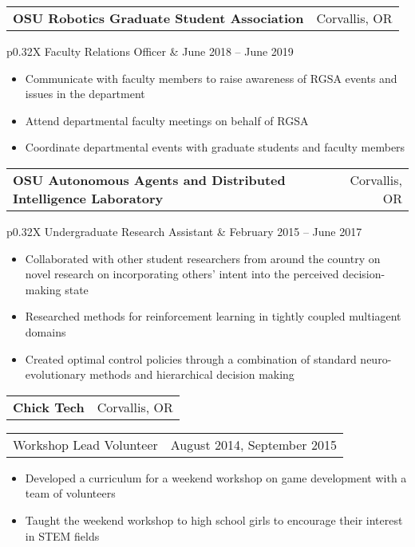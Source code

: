\documentclass[letterpaper,10pt,titlepage]{article}
\newcommand{\leftW}{0.32\textwidth}
\begin{document}
\begin{tabularx}{\linewidth}{Xr}
	\textbf{OSU Robotics Graduate Student Association} & Corvallis, OR\\
\end{tabularx}
\begin{tabularx}{\linewidth}{p{\leftW}X}
Faculty Relations Officer          & June 2018 -- June 2019\\
\end{tabularx}
\begin{itemize} \itemsep1pt \parskip0pt 
\item Communicate with faculty members to raise awareness of RGSA events and issues in the department
\item Attend departmental faculty meetings on behalf of RGSA
\item Coordinate departmental events with graduate students and faculty members
\end{itemize}

\begin{tabularx}{\linewidth}{Xr}
	\textbf{OSU Autonomous Agents and Distributed Intelligence Laboratory} & Corvallis, OR\\
\end{tabularx}
\begin{tabularx}{\linewidth}{p{\leftW}X}
Undergraduate Research Assistant          & February 2015 -- June 2017\\
\end{tabularx}
\begin{itemize} \itemsep1pt \parskip0pt 
\item Collaborated with other student researchers from around the country on novel research on incorporating others' intent into the perceived decision-making state
\item Researched methods for reinforcement learning in tightly coupled multiagent domains
\item Created optimal control policies through a combination of standard neuro-evolutionary methods and hierarchical decision making
\end{itemize}

\begin{tabularx}{\linewidth}{Xr}
	\textbf{Chick Tech} & Corvallis, OR\\
\end{tabularx}
\begin{tabularx}{\linewidth}{p{\leftW}X}
Workshop Lead Volunteer          &  August 2014, September 2015\\
\end{tabularx}
\begin{itemize} \itemsep1pt \parskip0pt 
\item Developed a curriculum for a weekend workshop on game development with a team of volunteers
\item Taught the weekend workshop to high school girls to encourage their interest in STEM fields
\end{itemize}
\end{document}
